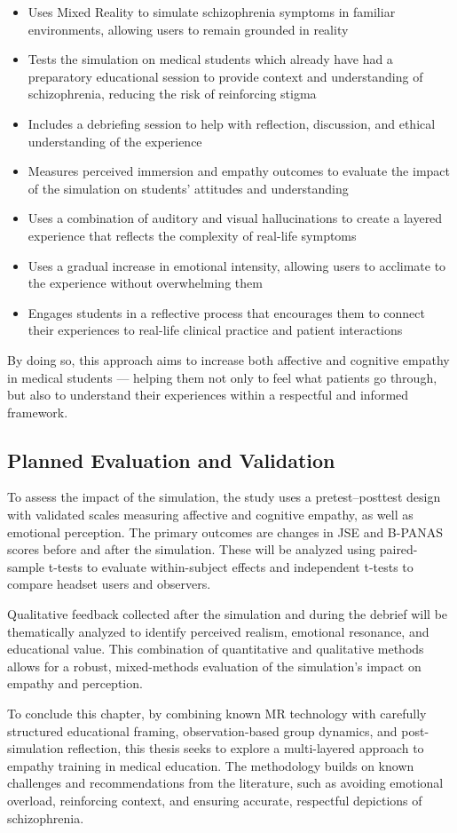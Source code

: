 \begin{itemize}
    \item Uses Mixed Reality to simulate schizophrenia symptoms in familiar environments, allowing users to remain grounded in reality
    \item Tests the simulation on medical students which already have had a preparatory educational session to provide context and understanding of schizophrenia, reducing the risk of reinforcing stigma
    \item Includes a debriefing session to help with reflection, discussion, and ethical understanding of the experience
    \item Measures perceived immersion and empathy outcomes to evaluate the impact of the simulation on students' attitudes and understanding
    \item Uses a combination of auditory and visual hallucinations to create a layered experience that reflects the complexity of real-life symptoms
    \item Uses a gradual increase in emotional intensity, allowing users to acclimate to the experience without overwhelming them
    \item Engages students in a reflective process that encourages them to connect their experiences to real-life clinical practice and patient interactions
\end{itemize}

By doing so, this approach aims to increase both affective and cognitive empathy in medical students — helping them not only to feel what patients go through, but also to understand their experiences within a respectful and informed framework.

\subsection{Planned Evaluation and Validation}

To assess the impact of the simulation, the study uses a pretest–posttest design with validated scales measuring affective and cognitive empathy, as well as emotional perception. The primary outcomes are changes in JSE and B-PANAS scores before and after the simulation. These will be analyzed using paired-sample t-tests to evaluate within-subject effects and independent t-tests to compare headset users and observers.

Qualitative feedback collected after the simulation and during the debrief will be thematically analyzed to identify perceived realism, emotional resonance, and educational value. This combination of quantitative and qualitative methods allows for a robust, mixed-methods evaluation of the simulation’s impact on empathy and perception.



To conclude this chapter, by combining known MR technology with carefully structured educational framing, observation-based group dynamics, and post-simulation reflection, this thesis seeks to explore a multi-layered approach to empathy training in medical education. The methodology builds on known challenges and recommendations from the literature, such as avoiding emotional overload, reinforcing context, and ensuring accurate, respectful depictions of schizophrenia. 
